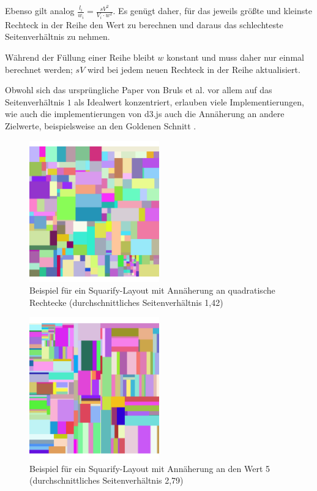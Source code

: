 Ebenso gilt analog $ \frac{l_i}{w_i} = \frac{sV^2}{V_i \cdot w^2} $. Es genügt daher, für das jeweils größte und kleinste Rechteck in der Reihe den Wert zu berechnen und daraus das schlechteste Seitenverhältnis zu nehmen.

Während der Füllung einer Reihe bleibt $w$ konstant und muss daher nur einmal berechnet werden; $sV$ wird bei jedem neuen Rechteck in der Reihe aktualisiert.

\smallskip

Obwohl sich das ursprüngliche Paper von Bruls et al. \cite{bruls2000squarified} vor allem auf das Seitenverhältnis $1$ als Idealwert konzentriert, erlauben viele Implementierungen, wie auch die implementierungen von d3.js \cite{d3_treemap_code} auch die Annäherung an andere Zielwerte, beispielsweise an den Goldenen Schnitt \cite{goldenRatio}.

\begin{figure}[h]
    \centering
    \includegraphics[width=0.5\textwidth]{images/oneSquarify.png}
    \caption{Beispiel für ein Squarify-Layout mit Annäherung an quadratische Rechtecke (durchschnittliches Seitenverhältnis 1,42)}
    \label{fig:squarifyRatio1}
\end{figure}

\begin{figure}[h]
    \centering
    \includegraphics[width=0.5\textwidth]{images/fiveSquarify.png}
    \caption{Beispiel für ein Squarify-Layout mit Annäherung an den Wert 5 (durchschnittliches Seitenverhältnis 2,79)}
    \label{fig:squarifyRatio5}
\end{figure}
